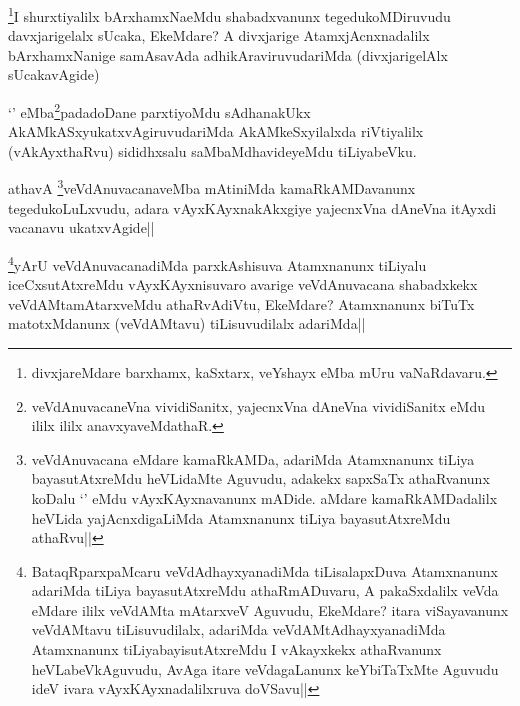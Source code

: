 \begin{artha}
\footnote{divxjareMdare barxhamx, kaSxtarx, veYshayx eMba mUru vaNaRdavaru.}I shurxtiyalilx bArxhamxNaeMdu shabadxvanunx tegedukoMDiruvudu davxjarigelalx sUcaka, EkeMdare? A divxjarige AtamxjAcnxnadalilx bArxhamxNanige samAsavAda adhikAraviruvudariMda (divxjarigelAlx sUcakavAgide)
\end{artha}


\begin{artha}
`\stext' eMba\footnote{veVdAnuvacaneVna vividiSanitx, yajecnxVna dAneVna vividiSanitx \stext eMdu ililx ililx anavxyaveMdathaR.}padadoDane parxtiyoMdu sAdhanakUkx AkAMkASxyukatxvAgiruvudariMda AkAMkeSxyilalxda riVtiyalilx (vAkAyxthaRvu) sididhxsalu saMbaMdhavideyeMdu tiLiyabeVku.
\end{artha}


\begin{artha}
athavA \footnote{veVdAnuvacana eMdare kamaRkAMDa, adariMda Atamxnanunx tiLiya bayasutAtxreMdu heVLidaMte Aguvudu, adakekx sapxSaTx athaRvanunx koDalu `\stext' eMdu vAyxKAyxnavanunx mADide. aMdare kamaRkAMDadalilx heVLida yajAcnxdigaLiMda Atamxnanunx tiLiya bayasutAtxreMdu athaRvu||}veVdAnuvacanaveMba mAtiniMda kamaRkAMDavanunx tegedukoLuLxvudu, adara vAyxKAyxnakAkxgiye yajecnxVna dAneVna itAyxdi vacanavu ukatxvAgide||
\end{artha}


\begin{artha}
\footnote{BataqRparxpaMcaru veVdAdhayxyanadiMda tiLisalapxDuva Atamxnanunx adariMda tiLiya bayasutAtxreMdu athaRmADuvaru, A pakaSxdalilx veVda eMdare ililx veVdAMta mAtarxveV Aguvudu, EkeMdare? itara viSayavanunx veVdAMtavu tiLisuvudilalx, adariMda veVdAMtAdhayxyanadiMda Atamxnanunx tiLiyabayisutAtxreMdu I vAkayxkekx athaRvanunx heVLabeVkAguvudu, AvAga itare veVdagaLanunx keYbiTaTxMte Aguvudu ideV ivara vAyxKAyxnadalilxruva doVSavu||}yArU veVdAnuvacanadiMda parxkAshisuva Atamxnanunx tiLiyalu iceCxsutAtxreMdu vAyxKAyxnisuvaro avarige veVdAnuvacana shabadxkekx veVdAMtamAtarxveMdu athaRvAdiVtu, EkeMdare? Atamxnanunx biTuTx matotxMdanunx (veVdAMtavu) tiLisuvudilalx adariMda||
\end{artha}

